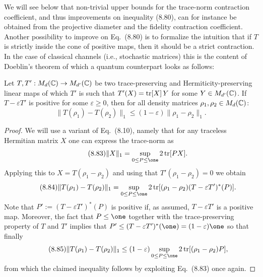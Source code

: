 \documentclass[11pt,a4paper]{article}
\theoremstyle{plain}
\theoremstyle{definition}
\theoremstyle{remark}
\begin{document}
We will see below that non-trivial upper bounds for the trace-norm contraction coefficient, and thus improvements on inequality (8.80), can for instance be obtained from the projective diameter and the fidelity contraction coefficient.
Another possibility to improve on Eq.~(8.80) is to formalize the intuition that if $T$ is strictly inside the cone of positive maps, then it should be a strict contraction.
In the case of classical channels (i.e., stochastic matrices) this is the content of Doeblin's theorem of which a quantum counterpart looks as follows:

\begin{theorem}
    Let $T,T':M_d(\mathbb{C})\to M_{d'}(\mathbb{C})$ be two trace-preserving and Hermiticity-preserving linear maps of which $T'$ is such that $T'(X)=\operatorname{tr}[X]\,Y$ for some $Y\in M_{d'}(\mathbb{C})$.
    If $T-\varepsilon T'$ is positive for some $\varepsilon\ge 0$, then for all density matrices $\rho_1,\rho_2\in M_d(\mathbb{C})$:
    \begin{equation}\tag{8.82}
        \|T(\rho_1)-T(\rho_2)\|_1 \le (1-\varepsilon) \|\rho_1-\rho_2\|_1.
    \end{equation}
\end{theorem}

\begin{proof}
    We will use a variant of Eq.~(8.10), namely that for any traceless Hermitian matrix $X$ one can express the trace-norm as
    \begin{equation}\tag{8.83}
        \|X\|_1 = \sup_{0\le P\le \one} 2\tr[P X].
    \end{equation}
    Applying this to $X=T(\rho_1-\rho_2)$ and using that $T'(\rho_1-\rho_2)=0$ we obtain
    \begin{equation}\tag{8.84}
        \|T(\rho_1)-T(\rho_2)\|_1
        =
        \sup_{0\le P\le \one} 2\tr[(\rho_1-\rho_2)(T-\varepsilon T')^\ast(P)].
    \end{equation}
    Note that $P':=(T-\varepsilon T')^\ast(P)$ is positive if, as assumed, $T-\varepsilon T'$ is a positive map.
    Moreover, the fact that $P\le \one$ together with the trace-preserving property of $T$ and $T'$ implies that
    $P'\le (T-\varepsilon T')^\ast(\one)=(1-\varepsilon)\one$ so that finally
    \begin{equation}\tag{8.85}
        \|T(\rho_1)-T(\rho_2)\|_1 \le (1-\varepsilon)\sup_{0\le P\le \one} 2\tr[(\rho_1-\rho_2)P],
    \end{equation}
    from which the claimed inequality follows by exploiting Eq.~(8.83) once again.
\end{proof}
\end{document}
